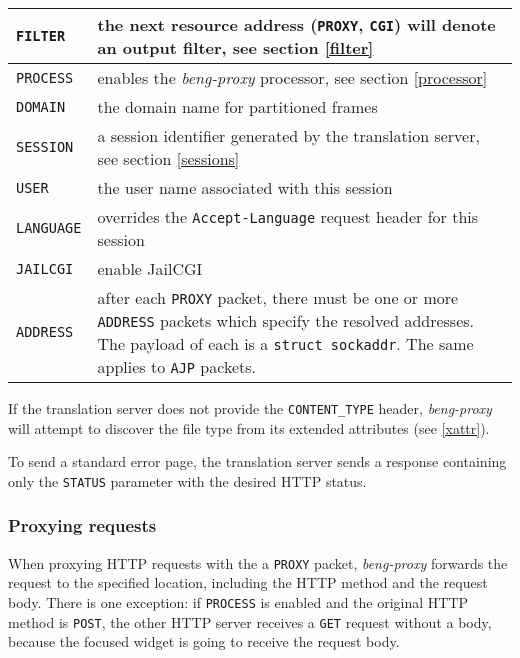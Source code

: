 \documentclass[a4paper,12pt]{article}
\begin{document}
\begin{tabular}{|l|p{10cm}|}
\hline

\texttt{FILTER} & the next resource address (\texttt{PROXY},
\texttt{CGI}) will denote an output filter, see section \ref{filter}
\\

\hline

\texttt{PROCESS} & enables the \emph{beng-proxy} processor, see
section \ref{processor} \\

\hline

\texttt{DOMAIN} & the domain name for partitioned frames \\

\hline

\texttt{SESSION} & a session identifier generated by the translation
server, see section \ref{sessions} \\

\hline

\texttt{USER} & the user name associated with this session \\

\hline

\texttt{LANGUAGE} & overrides the \texttt{Accept-Language} request
header for this session \\
\hline

\texttt{JAILCGI} & enable JailCGI \\

\hline

\texttt{ADDRESS} & after each \texttt{PROXY} packet, there must be one
or more \texttt{ADDRESS} packets which specify the resolved addresses.
The payload of each is a \texttt{struct sockaddr}.
The same applies to \texttt{AJP} packets. \\

\hline
\end{tabular}

If the translation server does not provide the \texttt{CONTENT\_TYPE}
header, \emph{beng-proxy} will attempt to discover the file type from
its extended attributes (see \ref{xattr}).

To send a standard error page, the translation server sends a response
containing only the \texttt{STATUS} parameter with the desired HTTP
status.

\subsubsection{Proxying requests}

When proxying HTTP requests with the a \texttt{PROXY} packet,
\emph{beng-proxy} forwards the request to the specified location,
including the HTTP method and the request body.  There is one
exception: if \texttt{PROCESS} is enabled and the original HTTP method
is \texttt{POST}, the other HTTP server receives a \texttt{GET}
request without a body, because the focused widget is going to receive
the request body.
\end{document}
